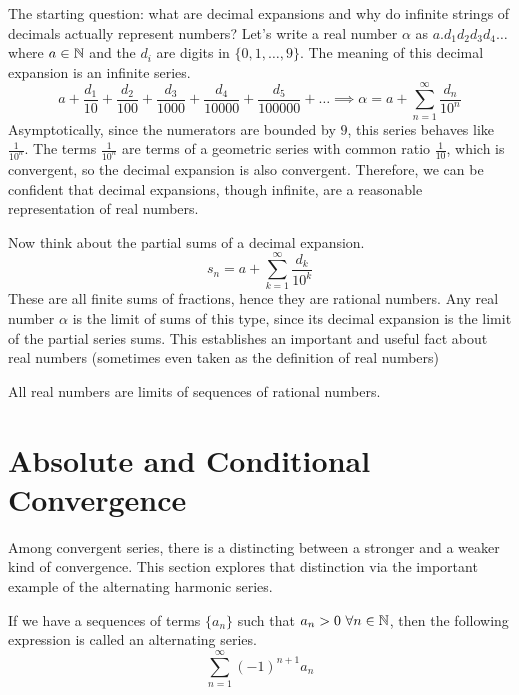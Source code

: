 \documentclass[fleqn]{report}
\begin{document}
The starting question: what are decimal expansions and why do
infinite strings of decimals actually represent numbers? Let's
write a real number $\alpha$ as $a.d_1d_2d_3d_4 \ldots $ where
$a \in \mathbb{N}$ and the $d_i$ are digits in $\{0, 1, \ldots, 9\}$.
The meaning of this decimal expansion is an infinite series.
\begin{equation*}
a + \frac{d_1}{10} + \frac{d_2}{100} + \frac{d_3}{1000} + 
\frac{d_4}{10000} + \frac{d_5}{100000} + \ldots \implies 
\alpha = a + \sum_{n=1}^\infty \frac{d_n}{10^n}
\end{equation*}
Asymptotically, since the numerators are bounded by $9$, this
series behaves like $\frac{1}{10^n}$. The terms
$\frac{1}{10^n}$ are terms of a geometric series with common
ratio $\frac{1}{10}$, which is convergent, so the decimal
expansion is also convergent. Therefore, we can be confident
that decimal expansions, though infinite, are a reasonable
representation of real numbers.

Now think about the partial sums of a decimal expansion. 
\begin{equation*}
s_n = a + \sum_{k=1}^\infty \frac{d_k}{10^k}
\end{equation*}
These are all finite sums of fractions, hence they are
rational numbers. Any real number $\alpha$ is the limit of
sums of this type, since its decimal expansion is the limit of
the partial series sums. This establishes an important and
useful fact about real numbers (sometimes even taken as the
definition of real numbers)

\begin{prop}All real numbers are limits of sequences of
rational numbers.
\end{prop}

\section{Absolute and Conditional Convergence}
\label{absolute-conditional}

Among convergent series, there is a distincting between a
stronger and a weaker kind of convergence. This section
explores that distinction via the important example of the
alternating harmonic series.

\begin{defn}
If we have a sequences of terms $\{a_n\}$ such that $a_n>0 \
\forall n \in \mathbb{N}$, then the following expression is called an
alternating series.
\begin{equation*}
\sum_{n=1}^\infty (-1)^{n+1} a_n 
\end{equation*}
\end{defn}
\end{document}
